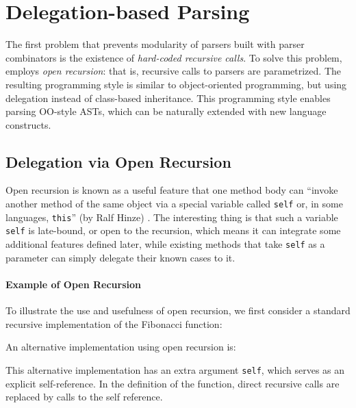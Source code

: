 \section{Delegation-based Parsing}\label{sec:openandparsing}

The first problem that prevents modularity of parsers built with
parser combinators is the existence of \emph{hard-coded recursive
  calls}. To solve this problem, \name employs \emph{open recursion}:
that is, recursive calls to parsers are parametrized. The resulting
programming style is similar to object-oriented programming,
but using delegation instead of class-based inheritance.
This programming style enables parsing OO-style ASTs, which
can be naturally extended with new language constructs.

\subsection{Delegation via Open Recursion}\label{subsec:openrecursion}

Open recursion is known as a useful feature that one method body can
``invoke another method of the same object via a special variable
called \lstinline{self} or, in some languages,
\lstinline[keywords={}]{this}'' (by Ralf Hinze)
. The interesting thing
is that such a variable \lstinline{self} is late-bound, or open to the
recursion, which means it can integrate some additional features
defined later, while existing methods that take \lstinline{self} as a
parameter can simply delegate their known cases to it.

\paragraph{Example of Open Recursion} To illustrate the use and
usefulness of open recursion, we first consider a standard recursive
implementation of the Fibonacci function:


\noindent An alternative implementation using open recursion is:

\noindent This alternative implementation has an extra argument
\lstinline{self}, which serves as an explicit self-reference. In the
definition of the function, direct recursive calls are replaced by
calls to the self reference.

